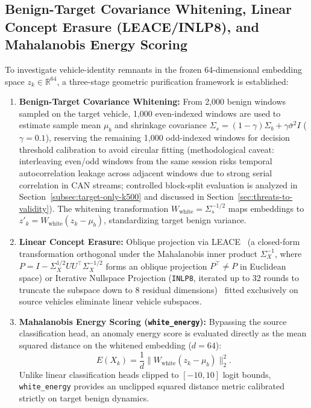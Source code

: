 \documentclass[12pt, a4paper, reqno, oneside]{book}
\DeclareRobustCommand{\code}[1]{\nolinkurl{#1}}
\begin{document}
\subsection[Benign Covariance Whitening, LEACE/INLP8, and Energy Scoring]{Benign-Target Covariance Whitening, Linear Concept Erasure (LEACE/INLP8), and Mahalanobis Energy Scoring}\label{subsec:method-whitening}
To investigate vehicle-identity remnants in the frozen 64-dimensional embedding space $z_k \in \mathbb{R}^{64}$, a three-stage geometric purification framework is established:
\begin{enumerate}
    \item \textbf{Benign-Target Covariance Whitening:} From 2,000 benign windows sampled on the target vehicle, 1,000 even-indexed windows are used to estimate sample mean $\mu_b$ and shrinkage covariance $\Sigma_s = (1-\gamma)\Sigma_b + \gamma \bar{\sigma}^2 I$ ($\gamma = 0.1$), reserving the remaining 1,000 odd-indexed windows for decision threshold calibration to avoid circular fitting (methodological caveat: interleaving even/odd windows from the same session risks temporal autocorrelation leakage across adjacent windows due to strong serial correlation in CAN streams; controlled block-split evaluation is analyzed in Section~\ref{subsec:target-only-k500} and discussed in Section~\ref{sec:threats-to-validity}). The whitening transformation $W_{\text{white}} = \Sigma_s^{-1/2}$ maps embeddings to $z'_k = W_{\text{white}}(z_k - \mu_b)$, standardizing target benign variance.
    \item \textbf{Linear Concept Erasure:} Oblique projection via LEACE~\cite{belrose2023leace} (a closed-form transformation orthogonal under the Mahalanobis inner product $\Sigma_X^{-1}$, where $P = I - \Sigma_X^{1/2}UU^\top\Sigma_X^{-1/2}$ forms an oblique projection $P^\top \neq P$ in Euclidean space) or Iterative Nullspace Projection (\code{INLP8}, iterated up to 32 rounds to truncate the subspace down to 8 residual dimensions)~\cite{ravfogel2020null} fitted exclusively on source vehicles eliminate linear vehicle subspaces.
    \item \textbf{Mahalanobis Energy Scoring (\code{white\_energy}):} Bypassing the source classification head, an anomaly energy score is evaluated directly as the mean squared distance on the whitened embedding ($d=64$):
    \begin{equation}
    E(X_k) = \frac{1}{d} \| W_{\text{white}} (z_k - \mu_b) \|_2^2.
    \end{equation}
    Unlike linear classification heads clipped to $[-10, 10]$ logit bounds, \code{white\_energy} provides an unclipped squared distance metric calibrated strictly on target benign dynamics.
\end{enumerate}
\end{document}
